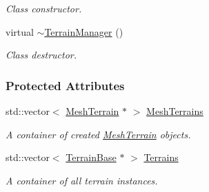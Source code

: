 \begin{DoxyCompactItemize}
\begin{DoxyCompactList}\small\item\em Class constructor. \item\end{DoxyCompactList}\item 
\hypertarget{classMezzanine_1_1TerrainManager_ae3896cc32b3a674511c851716e251d1a}{
virtual \hyperlink{classMezzanine_1_1TerrainManager_ae3896cc32b3a674511c851716e251d1a}{$\sim$TerrainManager} ()}
\label{classMezzanine_1_1TerrainManager_ae3896cc32b3a674511c851716e251d1a}

\begin{DoxyCompactList}\small\item\em Class destructor. \item\end{DoxyCompactList}\end{DoxyCompactItemize}
\subsubsection*{Protected Attributes}
\begin{DoxyCompactItemize}
\item 
\hypertarget{classMezzanine_1_1TerrainManager_a0790111fe5b0afabf775e74f172d0614}{
std::vector$<$ \hyperlink{classMezzanine_1_1MeshTerrain}{MeshTerrain} $\ast$ $>$ \hyperlink{classMezzanine_1_1TerrainManager_a0790111fe5b0afabf775e74f172d0614}{MeshTerrains}}
\label{classMezzanine_1_1TerrainManager_a0790111fe5b0afabf775e74f172d0614}

\begin{DoxyCompactList}\small\item\em A container of created \hyperlink{classMezzanine_1_1MeshTerrain}{MeshTerrain} objects. \item\end{DoxyCompactList}\item 
\hypertarget{classMezzanine_1_1TerrainManager_a8223a765f5a9c852d3da1bedae3b925e}{
std::vector$<$ \hyperlink{classMezzanine_1_1TerrainBase}{TerrainBase} $\ast$ $>$ \hyperlink{classMezzanine_1_1TerrainManager_a8223a765f5a9c852d3da1bedae3b925e}{Terrains}}
\label{classMezzanine_1_1TerrainManager_a8223a765f5a9c852d3da1bedae3b925e}

\begin{DoxyCompactList}\small\item\em A container of all terrain instances. \item\end{DoxyCompactList}\end{DoxyCompactItemize}


